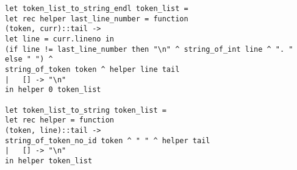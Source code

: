 \begin{verbatim}
let token_list_to_string_endl token_list =
let rec helper last_line_number = function
(token, curr)::tail ->
let line = curr.lineno in 
(if line != last_line_number then "\n" ^ string_of_int line ^ ". " else " ") ^
string_of_token token ^ helper line tail
| 	[] -> "\n"
in helper 0 token_list

let token_list_to_string token_list =
let rec helper = function
(token, line)::tail ->
string_of_token_no_id token ^ " " ^ helper tail
| 	[] -> "\n"
in helper token_list
\end{verbatim}	